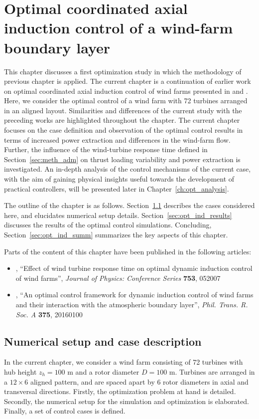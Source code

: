\chapter{Optimal coordinated axial induction control of a wind-farm boundary layer}\label{ch:opt_induction}
This chapter discusses a first optimization study in which the methodology of previous chapter is applied. The current chapter is a continuation of earlier work on optimal coordinated axial induction control of wind farms presented in \cite{goit2015optimal} and \cite{goit2016optimal}. Here, we consider the optimal control of a wind farm with 72 turbines arranged in an aligned layout. Similarities and differences of the current study with the preceding works are highlighted throughout the chapter. The current chapter focuses on the case definition and observation of the optimal control results in terms of increased power extraction and differences in the wind-farm flow. Further, the influence of the wind-turbine response time defined in Section~\ref{sec:meth_adm} on thrust loading variability and power extraction is investigated. An in-depth analysis of the control mechanisms of the current case, with the aim of gaining physical insights useful towards the development of practical controllers, will be presented later in Chapter~\ref{ch:opt_analysis}. 

The outline of the chapter is as follows. Section~\ref{sec:opt_ind_setup} describes the cases considered here, and elucidates numerical setup details. Section~\ref{sec:opt_ind_results} discusses the results of the optimal control simulations. Concluding, Section~\ref{sec:opt_ind_summ} summarizes the key aspects of this chapter. 

Parts of the content of this chapter have been published in the following articles:
\begin{itemize}
	\item \cite{munters2016effect}, ``Effect of wind turbine response time on optimal dynamic induction control of wind farms'', \emph{Journal of Physics: Conference Series} \textbf{753}, 052007
	\item \cite{munters2017optimal}, ``An optimal control framework for dynamic induction control of wind farms and their interaction with the atmospheric boundary layer'', \emph{Phil. Trans. R. Soc. A} \textbf{375}, 20160100
\end{itemize}

\section{Numerical setup and case description}\label{sec:opt_ind_setup}
In the current chapter, we consider a wind farm consisting of 72 turbines with hub height $z_h = 100$ m and a rotor diameter $D = 100$ m. Turbines are arranged in a $12 \times 6$ aligned pattern, and are spaced apart by 6 rotor diameters in axial and transversal directions. Firstly, the optimization problem at hand is detailed. Secondly, the numerical setup for the simulation and optimization is elaborated. Finally, a set of control cases is defined. 

